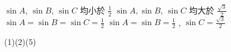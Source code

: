 \begin{QUESTIONS}
\begin{QUESTION}
\begin{QBODY}
\begin{QOPS}
                \QOP $\sin A$, $\sin B$, $\sin C$ 均小於 $\frac{1}{2}$ 
                \QOP $\sin A, \sin B$, $\sin C$ 均大於 $\frac{\sqrt{3}}{2}$ 
                \QOP $\sin A = \sin B = \sin C =\frac{1}{2}$ 
                \QOP $\sin A= \sin B= \frac{1}{2}$ , $\sin C= \frac{\sqrt{3}}{2}$
            \end{QOPS}
        \end{QBODY}
        \begin{QFROMS}
        \end{QFROMS}
        \begin{QTAGS}\end{QTAGS}
        \begin{QANS}
            (1)(2)(5)
        \end{QANS}
        \begin{QSOLLIST}
        \end{QSOLLIST}
        \begin{QEMPTYSPACE}
        \end{QEMPTYSPACE}
    \end{QUESTION}
\end{QUESTIONS}
